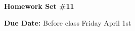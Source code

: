 


\thispagestyle{fancy}






\begin{center}
{\huge \textbf{Homework Set \#11 }}
\large

{\textbf{ Due Date:} Before class Friday April 1st  } 
\end{center}

